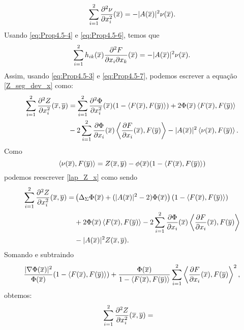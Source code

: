 \begin{demonstracao}
\begin{eqnarray} \label{eq:Prop4.5-6}	
\sum_{i=1}^2 \frac{\partial^2 \nu}{\partial x_i^2}(\overline{x}) = - | A(\overline{x}) |^2 \nu(\overline{x}).
\end{eqnarray}
Usando \eqref{eq:Prop4.5-4} e \eqref{eq:Prop4.5-6}, temos que
\begin{eqnarray} \label{eq:Prop4.5-7}
\sum_{i=1}^2 h_{ik}(\overline{x}) \frac{\partial^2 F}{\partial x_i \partial x_k}(\overline{x}) 
= - | A(\overline{x}) |^2 \nu(\overline{x}).
\end{eqnarray}	
Assim, usando \eqref{eq:Prop4.5-3} e \eqref{eq:Prop4.5-7}, podemos
escrever a equa\c c\~ao \eqref{Z_seg_dev_x} como:
\begin{eqnarray}
\begin{aligned} \label{lap_Z_x}
\sum_{i=1}^2 \frac{\partial^2 Z}{\partial x_i^2}(\overline{x},\overline{y}) & =   
\sum_{i=1}^2 \frac{\partial^2 \Phi}{\partial x_i^2}(\overline{x})
(1 - \langle F(\overline{x}), F(\overline{y}) \rangle)    
+ 2  \Phi(\overline{x}) \left\langle F(\overline{x}), F(\overline{y}) \right\rangle \\
& -2 \sum_{i=1}^2 \frac{\partial \Phi}{\partial x_i}(\overline{x}) 
\left\langle \frac{\partial F}{\partial x_i}(\overline{x}), F(\overline{y}) \right\rangle
- | A(\overline{x}) |^2 \left\langle \nu(\overline{x}), F(\overline{y}) \right\rangle.
\end{aligned}
\end{eqnarray}
Como
\[
\left\langle \nu(\overline{x}), F(\overline{y}) \right\rangle = Z(\overline{x},\overline{y})
-\phi(\overline{x})(1-\langle F(\overline{x}),F(\overline{y})\rangle)
\]
podemos reescrever \eqref{lap_Z_x} como sendo
\begin{eqnarray*}
\begin{aligned}
\sum_{i=1}^2 \frac{\partial^2 Z}{\partial x_i^2}(\overline{x},\overline{y}) = &
\left(\Delta_{\Sigma} \Phi(\overline{x}) + 
(|A(\overline{x})|^2 - 2)\Phi(\overline{x})\right)(1 - \langle F(\overline{x}), F(\overline{y}) \rangle) \\
&+ 2 \Phi(\overline{x}) \left\langle F(\overline{x}), F(\overline{y}) \right\rangle
- 2 \sum_{i=1}^2 \frac{\partial \Phi}{\partial x_i}(\overline{x}) 
\left\langle \frac{\partial F}{\partial x_i}(\overline{x}), F(\overline{y}) \right\rangle \\
&- |A(\overline{x})|^2Z(\overline{x},\overline{y}).
\end{aligned}
\end{eqnarray*}	
Somando e subtraindo
\[
\frac{|\nabla \Phi(\overline{x})|^2}{\Phi(\overline{x})} (1 - \langle F(\overline{x}), F(\overline{y}) \rangle) + \frac{\Phi(\overline{x})}{1 - \langle F(\overline{x}),F(\overline{y}) \rangle} \sum_{i=1}^2 \left\langle \frac{\partial F}{\partial x_i} (\overline{x}), F(\overline{y}) \right\rangle^2,
\]
obtemos:
\begin{eqnarray*}
\begin{aligned}
\sum_{i=1}^2 \frac{\partial^2 Z}{\partial x_i^2}(\xb,\yb) &=

\end{aligned}
\end{eqnarray*}
\end{demonstracao}
